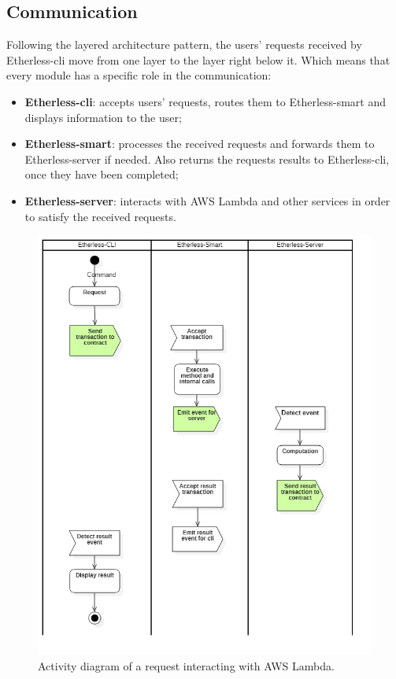 	\subsection{Communication} %
	Following the layered architecture pattern, the users' requests received by Etherless-cli move from one layer to the layer right below it. Which means that every module has a specific role in the communication:
	\begin{itemize}
		\item \textbf{Etherless-cli}: accepts users' requests, routes them to Etherless-smart and displays information to the user;
		\item \textbf{Etherless-smart}: processes the received requests and forwards them to Etherless-server if needed. Also returns the requests results to Etherless-cli, once they have been completed;
		\item \textbf{Etherless-server}: interacts with AWS Lambda and other services in order to satisfy the received requests.
	\end{itemize}
	\begin{figure}
		\centering
		\includegraphics[width=0.9\linewidth]{diagrammi/generali/activity_diag_pattern2}
		\caption{Activity diagram of a request interacting with AWS Lambda.}
	\end{figure}
